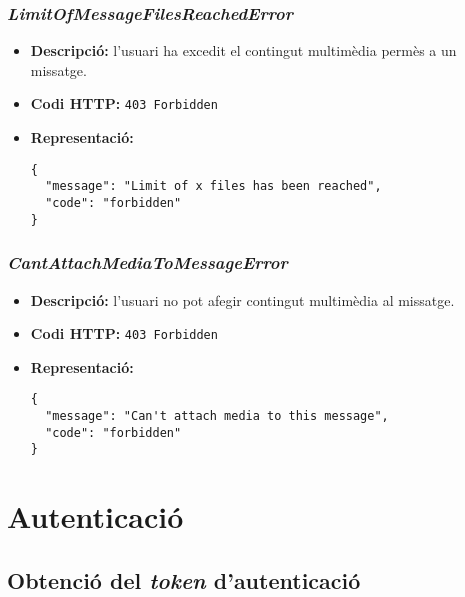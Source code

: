 \subsubsection{\emph{LimitOfMessageFilesReachedError}}
\begin{itemize}
	\item \textbf{Descripció:} l'usuari ha excedit el contingut multimèdia permès a un missatge.
	\item \textbf{Codi \ac{HTTP}:} \texttt{403 Forbidden}
	\item \textbf{Representació:}
\begin{verbatim}
{
  "message": "Limit of x files has been reached",
  "code": "forbidden"
}
\end{verbatim}
\end{itemize}

\subsubsection{\emph{CantAttachMediaToMessageError}}
\begin{itemize}
	\item \textbf{Descripció:} l'usuari no pot afegir contingut multimèdia al missatge.
	\item \textbf{Codi \ac{HTTP}:} \texttt{403 Forbidden}
	\item \textbf{Representació:}
\begin{verbatim}
{
  "message": "Can't attach media to this message",
  "code": "forbidden"
}
\end{verbatim}
\end{itemize}

\section{Autenticació}

\subsection{Obtenció del \emph{token} d'autenticació}

